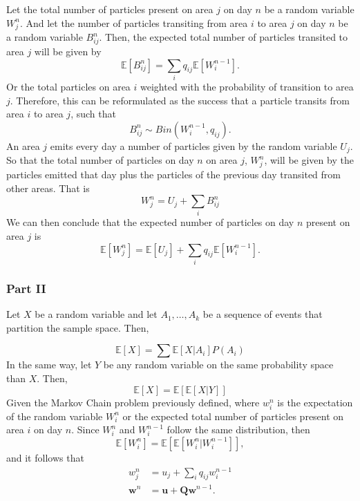 \documentclass[11pt, a4paper]{article}
\begin{document}
Let the total number of particles present on area $j$ on day $n$ be a random variable $W_j^n$. And let the number of particles transiting from area $i$ to area $j$ on day $n$ be a random variable $B_{ij}^{n}$.
Then, the expected total number of particles transited to area $j$ will be given by 
\[
	\mathbb{E}[B_{ij}^{n}] = \sum_i q_{ij}\mathbb{E}[W_i^{n-1}].
\]
Or the total particles on area $i$ weighted with the probability of transition to area $j$. Therefore, this can be reformulated as the success that a particle transits from area $i$ to area $j$, such that
\[
	B_{ij}^n \sim Bin(W_i^{n-1}, q_{ij}).
\]
An area $j$ emits every day a number of particles given by the random variable $U_j$. So that the total number of particles on day $n$ on area $j$, $W_j^n$, will be given by the particles emitted that day plus the particles of the previous day transited from other areas. That is
\[
	W_j^n = U_j + \sum_iB_{ij}^n
\]
We can then conclude that the expected number of particles on day $n$ present on area $j$ is
\[
	\mathbb{E}[W_j^n] = \mathbb{E}[U_j] + \sum_i q_{ij}\mathbb{E}[W_i^{n-1}].
\]

\subsubsection*{Part II}
Let $X$ be a random variable and let $A_1, \dots, A_k$ be a sequence of events that partition the sample space. Then, 

\[
\mathbb{E}[X] = \sum \mathbb{E}[X|A_i]P(A_i)
\]
In the same way, let $Y$ be any random variable on the same probability space than $X$. Then,
\[
\mathbb{E}[X] = \mathbb{E}[\mathbb{E}[X|Y]]
\]
Given the Markov Chain problem previously defined, where $w_i^n$ is the expectation of the random variable $W_i^n$ or the expected total number of particles present on area $i$ on day $n$. 
Since $W_i^n$ and $W_i^{n-1}$ follow the same distribution, then
\[
\mathbb{E}[W_i^n] = \mathbb{E}[\mathbb{E}[W_i^n | W_i^{n-1}]],
\]
and it follows that
\[
\begin{aligned}
w_j^n &= u_j + \sum_i q_{ij}w_i^{n-1} \\
\mathbf w^n &= \mathbf u + \mathbf Q\mathbf w^{n-1}. 
\end{aligned}
\]
\end{document}
